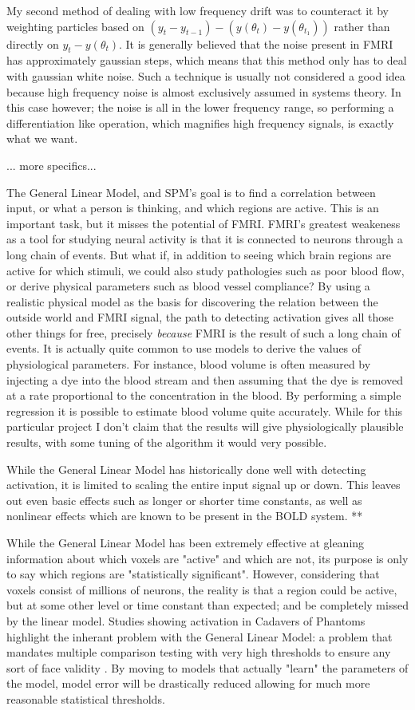 \documentclass{article}
\begin{document}
My second method of dealing with low frequency drift was to counteract
it by weighting particles based on $(y_t-y_{t-1}) - (y(\theta_t)-y(\theta_{t_1}))$ 
rather than directly on $y_t - y(\theta_t)$. It is generally believed that the noise present in 
FMRI has approximately gaussian steps, which means that this method only
has to deal with gaussian white noise. Such a technique is usually not considered a
good idea because high frequency noise is almost exclusively assumed in
systems theory. In this case however; the noise is all in the lower frequency
range, so performing a differentiation like operation, which magnifies high
frequency signals, is exactly what we want. 

... more specifics...

The General Linear Model, and 
SPM's goal is to find a correlation between input, or what a 
person is thinking, and which regions are active. This is an 
important task, but it misses the potential of FMRI. FMRI's 
greatest weakeness as a tool for studying neural activity is that
it is connected to neurons through a long chain of events. But
what if, in addition to seeing which brain regions are active
for which stimuli, we could also study pathologies such as poor
blood flow, or derive physical parameters such as blood vessel
compliance? By using a realistic physical model as the basis for
discovering the relation between the outside world and FMRI 
signal, the path to detecting activation gives all those other
things for free, precisely \emph{because} FMRI is the result of such
a long chain of events. It is actually quite common to use models to derive
the values of physiological parameters. For instance, blood volume
is often measured by injecting a dye into the blood stream and then
assuming that the dye is removed at a rate proportional to the
concentration in the blood. By performing a simple regression it is
possible to estimate blood volume quite accurately. While for
this particular project I don't claim that the results will give 
physiologically plausible results, with some tuning of the algorithm
it would very possible. 

While the General Linear Model has historically done well with
detecting activation, it is limited to scaling the entire input
signal up or down. This leaves out even basic effects such as 
longer or shorter time constants, as well as nonlinear effects which
are known to be present in the BOLD system. 
**


While the General Linear Model has been extremely effective at
gleaning information about which voxels are "active" and which
are not, its purpose is only to say which regions are "statistically
significant". However, considering that voxels consist of millions
of neurons, the reality is that a
region could be active, but at some other level or time constant
than expected; and be completely missed by the linear model. 
Studies showing activation
in Cadavers of Phantoms highlight the inherant problem with the 
General Linear Model: a problem that mandates multiple
comparison testing with very high thresholds to ensure any 
sort of face validity \cite{drift}.
By moving to models that actually "learn" the 
parameters of the model, model error will be drastically
reduced allowing for much more reasonable statistical thresholds.
\end{document}
